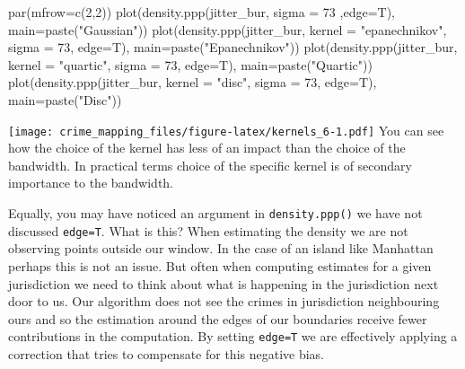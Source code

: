 \documentclass[
  krantz2]{krantz}
\makeatletter
\newenvironment{Shaded}{\begin{snugshade}}{\end{snugshade}}
\newcommand{\AttributeTok}[1]{\textcolor[rgb]{0.61,0.61,0.61}{#1}}
\newcommand{\DecValTok}[1]{\textcolor[rgb]{0.06,0.06,0.06}{#1}}
\newcommand{\FunctionTok}[1]{\textcolor[rgb]{0,0,0}{#1}}
\newcommand{\NormalTok}[1]{#1}
\newcommand{\StringTok}[1]{\textcolor[rgb]{0.5,0.5,0.5}{#1}}
\newenvironment{kframe}{%
\medskip{}
\setlength{\fboxsep}{.8em}
 \def\at@end@of@kframe{}%
 \ifinner\ifhmode%
  \def\at@end@of@kframe{\end{minipage}}%
  \begin{minipage}{\columnwidth}%
 \fi\fi%
 \def\FrameCommand##1{\hskip\@totalleftmargin \hskip-\fboxsep
 \colorbox{shadecolor}{##1}\hskip-\fboxsep
     \hskip-\linewidth \hskip-\@totalleftmargin \hskip\columnwidth}%
 \MakeFramed {\advance\hsize-\width
   \@totalleftmargin\z@ \linewidth\hsize
   \@setminipage}}%
 {\par\unskip\endMakeFramed%
 \at@end@of@kframe}
\renewenvironment{Shaded}{\begin{kframe}}{\end{kframe}}
\makeatother
\begin{document}
\begin{Shaded}
\begin{Highlighting}[]
\FunctionTok{par}\NormalTok{(}\AttributeTok{mfrow=}\FunctionTok{c}\NormalTok{(}\DecValTok{2}\NormalTok{,}\DecValTok{2}\NormalTok{))}
\FunctionTok{plot}\NormalTok{(}\FunctionTok{density.ppp}\NormalTok{(jitter\_bur, }\AttributeTok{sigma =} \DecValTok{73}\NormalTok{ ,}\AttributeTok{edge=}\NormalTok{T),}
     \AttributeTok{main=}\FunctionTok{paste}\NormalTok{(}\StringTok{"Gaussian"}\NormalTok{))}
\FunctionTok{plot}\NormalTok{(}\FunctionTok{density.ppp}\NormalTok{(jitter\_bur, }\AttributeTok{kernel =} \StringTok{"epanechnikov"}\NormalTok{, }\AttributeTok{sigma =} \DecValTok{73}\NormalTok{, }\AttributeTok{edge=}\NormalTok{T),}
     \AttributeTok{main=}\FunctionTok{paste}\NormalTok{(}\StringTok{"Epanechnikov"}\NormalTok{))}
\FunctionTok{plot}\NormalTok{(}\FunctionTok{density.ppp}\NormalTok{(jitter\_bur, }\AttributeTok{kernel =} \StringTok{"quartic"}\NormalTok{, }\AttributeTok{sigma =} \DecValTok{73}\NormalTok{, }\AttributeTok{edge=}\NormalTok{T),}
     \AttributeTok{main=}\FunctionTok{paste}\NormalTok{(}\StringTok{"Quartic"}\NormalTok{))}
\FunctionTok{plot}\NormalTok{(}\FunctionTok{density.ppp}\NormalTok{(jitter\_bur, }\AttributeTok{kernel =} \StringTok{"disc"}\NormalTok{, }\AttributeTok{sigma =} \DecValTok{73}\NormalTok{, }\AttributeTok{edge=}\NormalTok{T),}
     \AttributeTok{main=}\FunctionTok{paste}\NormalTok{(}\StringTok{"Disc"}\NormalTok{))}
\end{Highlighting}
\end{Shaded}

\texttt{[image: crime\_mapping\_files/figure-latex/kernels\_6-1.pdf]}
You can see how the choice of the kernel has less of an impact than the choice of the bandwidth. In practical terms choice of the specific kernel is of secondary importance to the bandwidth.

Equally, you may have noticed an argument in \texttt{density.ppp()} we have not discussed \texttt{edge=T}. What is this? When estimating the density we are not observing points outside our window. In the case of an island like Manhattan perhaps this is not an issue. But often when computing estimates for a given jurisdiction we need to think about what is happening in the jurisdiction next door to us. Our algorithm does not see the crimes in jurisdiction neighbouring ours and so the estimation around the edges of our boundaries receive fewer contributions in the computation. By setting \texttt{edge=T} we are effectively applying a correction that tries to compensate for this negative bias.
\end{document}
